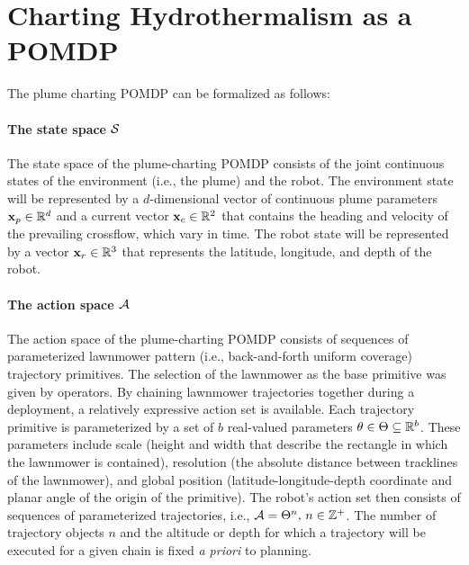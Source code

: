 
\section{Charting Hydrothermalism as a POMDP}
\label{sec:pomdp}
The plume charting POMDP can be formalized as follows: 

\paragraph{The state space $\mathcal{S}$} The state space of the plume-charting POMDP consists of the joint continuous states of the environment (i.e., the plume) and the robot. The environment state will be represented by a $d$-dimensional vector of continuous plume parameters $\mathbf{x}_p \in \mathbb{R}^d$ and a current vector $\mathbf{x}_c \in \mathbb{R}^2$ that contains the heading and velocity of the prevailing crossflow, which vary in time. The robot state will be represented by a vector $\mathbf{x}_r \in \mathbb{R}^3$ that represents the latitude, longitude, and depth of the robot.

\paragraph{The action space $\mathcal{A}$} The action space of the plume-charting POMDP consists of sequences of parameterized lawnmower pattern (i.e., back-and-forth uniform coverage) trajectory primitives. The selection of the lawnmower as the base primitive was given by \Sentry operators. By chaining lawnmower trajectories together during a deployment, a relatively expressive action set is available. Each trajectory primitive is parameterized by a set of $b$ real-valued parameters $\theta \in \Theta \subseteq \mathbb{R}^b$. These parameters include scale (height and width that describe the rectangle in which the lawnmower is contained), resolution (the absolute distance between tracklines of the lawnmower), and global position (latitude-longitude-depth coordinate and planar angle of the origin of the primitive). The robot's action set then consists of sequences of parameterized trajectories, i.e., $\mathcal{A} = \Theta^n, \, n \in \mathbb{Z}^+$. The number of trajectory objects $n$ and the altitude or depth for which a trajectory will be executed for a given chain is fixed \emph{a priori} to planning. 

